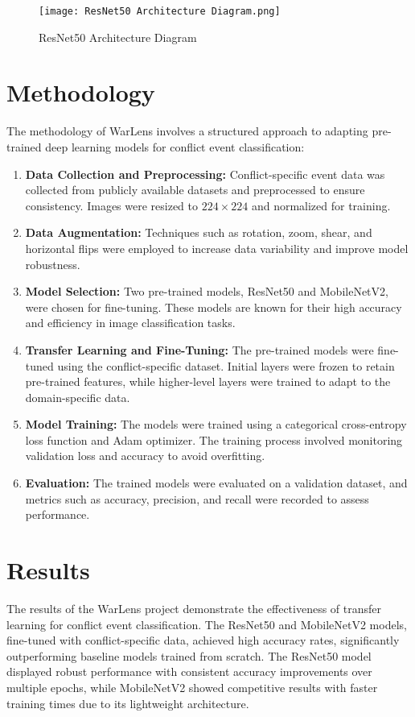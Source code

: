 \documentclass[conference]{IEEEtran}
\begin{document}
\begin{figure}[h]
\centering
\texttt{[image: ResNet50 Architecture Diagram.png]}
\caption{ResNet50 Architecture Diagram}
\label{fig:resnet_architecture}
\end{figure}

\section{Methodology}
The methodology of WarLens involves a structured approach to adapting pre-trained deep learning models for conflict event classification:

\begin{enumerate}
    \item \textbf{Data Collection and Preprocessing:} Conflict-specific event data was collected from publicly available datasets and preprocessed to ensure consistency. Images were resized to $224 \times 224$ and normalized for training.
    \item \textbf{Data Augmentation:} Techniques such as rotation, zoom, shear, and horizontal flips were employed to increase data variability and improve model robustness.
    \item \textbf{Model Selection:} Two pre-trained models, ResNet50 and MobileNetV2, were chosen for fine-tuning. These models are known for their high accuracy and efficiency in image classification tasks.
    \item \textbf{Transfer Learning and Fine-Tuning:} The pre-trained models were fine-tuned using the conflict-specific dataset. Initial layers were frozen to retain pre-trained features, while higher-level layers were trained to adapt to the domain-specific data.
    \item \textbf{Model Training:} The models were trained using a categorical cross-entropy loss function and Adam optimizer. The training process involved monitoring validation loss and accuracy to avoid overfitting.
    \item \textbf{Evaluation:} The trained models were evaluated on a validation dataset, and metrics such as accuracy, precision, and recall were recorded to assess performance.
\end{enumerate}

\section{Results}
The results of the WarLens project demonstrate the effectiveness of transfer learning for conflict event classification. The ResNet50 and MobileNetV2 models, fine-tuned with conflict-specific data, achieved high accuracy rates, significantly outperforming baseline models trained from scratch. The ResNet50 model displayed robust performance with consistent accuracy improvements over multiple epochs, while MobileNetV2 showed competitive results with faster training times due to its lightweight architecture.
\end{document}
